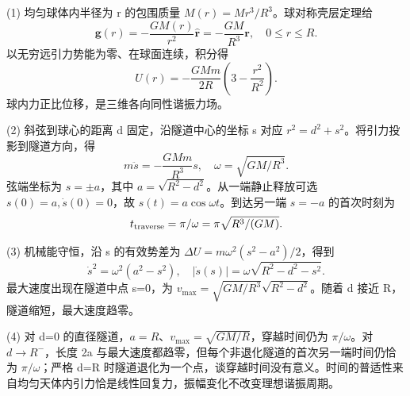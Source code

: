 (1) 均匀球体内半径为 r 的包围质量 \(M(r)=Mr^3/R^3\)。球对称壳层定理给
\[
\boldsymbol g(r)=-\frac{GM(r)}{r^2}\hat{\boldsymbol r}
=-\frac{GM}{R^3}\boldsymbol r,\quad 0\le r\le R.
\]
以无穷远引力势能为零、在球面连续，积分得
\[
U(r)=-\frac{GMm}{2R}\left(3-\frac{r^2}{R^2}\right).
\]
球内力正比位移，是三维各向同性谐振力场。

(2) 斜弦到球心的距离 d 固定，沿隧道中心的坐标 s 对应 \(r^2=d^2+s^2\)。将引力投影到隧道方向，得
\[
m\ddot s=-\frac{GMm}{R^3}s,\quad
\omega=\sqrt{GM/R^3}.
\]
弦端坐标为 \(s=\pm a\)，其中 \(a=\sqrt{R^2-d^2}\)。从一端静止释放可选 \(s(0)=a,\dot s(0)=0\)，故 \(s(t)=a\cos\omega t\)。到达另一端 \(s=-a\) 的首次时刻为
\[
t_{\rm traverse}=\pi/\omega=\pi\sqrt{R^3/(GM)}.
\]

(3) 机械能守恒，沿 s 的有效势差为 \(\Delta U=m\omega^2(s^2-a^2)/2\)，得到
\[
\dot s^2=\omega^2(a^2-s^2),\quad
|\dot s(s)|=\omega\sqrt{R^2-d^2-s^2}.
\]
最大速度出现在隧道中点 s=0，为 \(v_{\max}=\sqrt{GM/R^3}\sqrt{R^2-d^2}\)。随着 d 接近 R，隧道缩短，最大速度趋零。

(4) 对 d=0 的直径隧道，\(a=R\)、\(v_{\max}=\sqrt{GM/R}\)，穿越时间仍为 \(\pi /\omega \)。对 \(d\to R^-\)，长度 2a 与最大速度都趋零，但每个非退化隧道的首次另一端时间仍恰为 \(\pi /\omega \)；严格 d=R 时隧道退化为一个点，谈穿越时间没有意义。时间的普适性来自均匀天体内引力恰是线性回复力，振幅变化不改变理想谐振周期。
